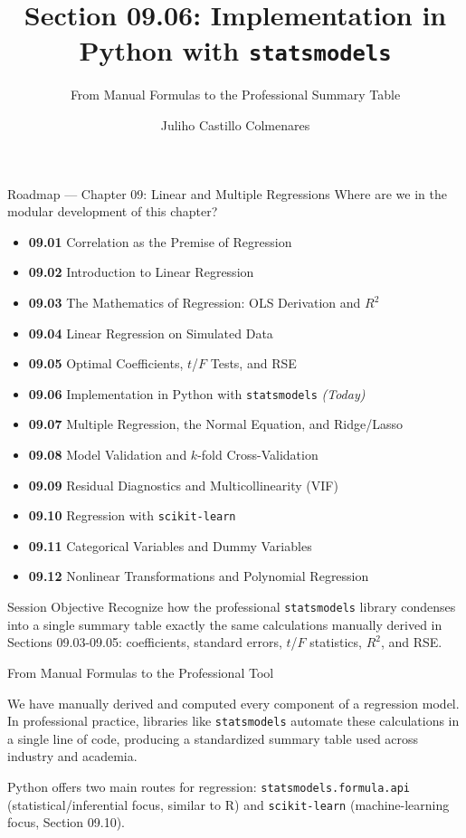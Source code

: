 \documentclass[10pt, aspectratio=169]{beamer}
\title[Implementation in Python]{Section 09.06: Implementation in Python with \texttt{statsmodels}}
\subtitle{From Manual Formulas to the Professional Summary Table}
\author[J. Castillo Colmenares]{Juliho Castillo Colmenares}
\institute{Tecnológico de Monterrey}
\date{\vspace{-1.5cm}}
\begin{document}
\begin{frame}[plain]
  \titlepage
\end{frame}

\begin{frame}{Roadmap --- Chapter 09: Linear and Multiple Regressions}
  \scriptsize
  Where are we in the modular development of this chapter?
  \begin{itemize}\itemsep=0.02em
    \item \textbf{09.01} Correlation as the Premise of Regression
    \item \textbf{09.02} Introduction to Linear Regression
    \item \textbf{09.03} The Mathematics of Regression: OLS Derivation and $R^2$
    \item \textbf{09.04} Linear Regression on Simulated Data
    \item \textbf{09.05} Optimal Coefficients, $t$/$F$ Tests, and RSE
    \item \textbf{09.06} Implementation in Python with \texttt{statsmodels} \emph{(Today)}
    \item \textbf{09.07} Multiple Regression, the Normal Equation, and Ridge/Lasso
    \item \textbf{09.08} Model Validation and $k$-fold Cross-Validation
    \item \textbf{09.09} Residual Diagnostics and Multicollinearity (VIF)
    \item \textbf{09.10} Regression with \texttt{scikit-learn}
    \item \textbf{09.11} Categorical Variables and Dummy Variables
    \item \textbf{09.12} Nonlinear Transformations and Polynomial Regression
  \end{itemize}
  \pause
  \vspace{-0.05cm}
  \begin{block}{Session Objective}
    Recognize how the professional \texttt{statsmodels} library condenses into a single summary table exactly the same calculations manually derived in Sections 09.03-09.05: coefficients, standard errors, $t$/$F$ statistics, $R^2$, and RSE.
  \end{block}
\end{frame}

\begin{frame}{From Manual Formulas to the Professional Tool}
  \footnotesize
  \begin{motivacion}
    We have manually derived and computed every component of a regression model. In professional practice, libraries like \texttt{statsmodels} automate these calculations in a single line of code, producing a standardized summary table used across industry and academia.
  \end{motivacion}

  \vspace{0.15cm}
  \pause
  Python offers two main routes for regression: \texttt{statsmodels.formula.api} (statistical/inferential focus, similar to R) and \texttt{scikit-learn} (machine-learning focus, Section 09.10).
\end{frame}
\end{document}
